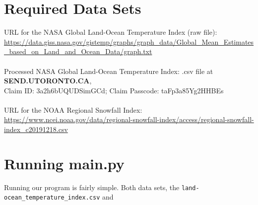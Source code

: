\documentclass[fontsize=11pt]{article}
\begin{document}
\section*{Required Data Sets}

URL for the NASA Global Land-Ocean Temperature Index (raw file): \url{https://data.giss.nasa.gov/gistemp/graphs/graph_data/Global_Mean_Estimates_based_on_Land_and_Ocean_Data/graph.txt}\\
\\
Processed NASA Global Land-Ocean Temperature Index: .csv file at \textbf{ SEND.UTORONTO.CA}, \\Claim ID: 3a2h6bUQUDSimGCd; Claim Passcode: taFp3a85Yg2HHBEs\\
\\
URL for the NOAA Regional Snowfall Index: 
\url{https://www.ncei.noaa.gov/data/regional-snowfall-index/access/regional-snowfall-index_c20191218.csv}

\section*{Running main.py}
Running our program is fairly simple. Both data sets, the \texttt{land-ocean\_temperature\_index.csv} and 
\end{document}
